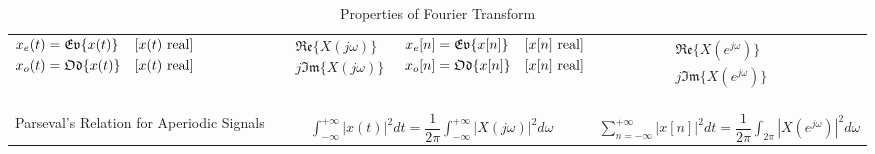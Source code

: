 \documentclass[landscape,a4paper]{article}
\begin{document}
\begin{table}[htbp]
\begin{tabular}{p{12em}<{\centering}cccc}
$\begin{aligned}
x_e(t)&=\mathfrak{Ev}\{x(t)\} & [x(t){\rm\ real}] \\
x_o(t)&=\mathfrak{Od}\{x(t)\} & [x(t){\rm\ real}] \\
\end{aligned}$ & 
$\begin{aligned}
&\mathfrak{Re}\{X(j\omega)\} \\
&j\mathfrak{Im}\{X(j\omega)\} \\
\end{aligned}$ &
$\begin{aligned}
x_e[n]&=\mathfrak{Ev}\{x[n]\} & [x[n]{\rm\ real}] \\
x_o[n]&=\mathfrak{Od}\{x[n]\} & [x[n]{\rm\ real}] \\
\end{aligned}$ & 
$\begin{aligned}
&\mathfrak{Re}\{X(e^{j\omega})\} \\
&j\mathfrak{Im}\{X(e^{j\omega})\} \\
\end{aligned}$ \\
& \\
\hdashline
& \\
Parseval's Relation for Aperiodic Signals 
& \multicolumn{2}{c}{$\displaystyle\int_{-\infty}^{+\infty}|x(t)|^2dt=\dfrac{1}{2\pi}\int_{-\infty}^{+\infty}|X(j\omega)|^2d\omega$} 
& \multicolumn{2}{c}{$\displaystyle\sum\limits_{n=-\infty}^{+\infty}|x[n]|^2dt=\dfrac{1}{2\pi}\int_{2\pi}|X(e^{j\omega})|^2d\omega$} \\
\hline
\end{tabular}
\caption{Properties of Fourier Transform}
\end{table}

\newpage
\end{document}
